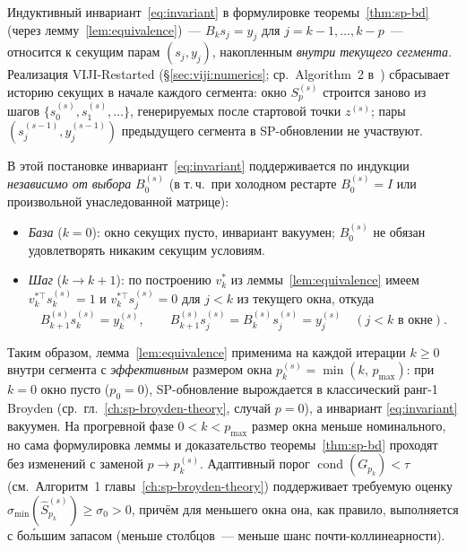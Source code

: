 \begin{remark}
\label{rem:invariant-restart}
Индуктивный инвариант~\eqref{eq:invariant} в формулировке
теоремы~\ref{thm:sp-bd} (через лемму~\ref{lem:equivalence})~---
$B_k s_j = y_j$ для $j = k{-}1,\ldots,k{-}p$~--- относится к секущим
парам $(s_j, y_j)$, накопленным \emph{внутри текущего сегмента}.
Реализация VIJI-Restarted (\S\ref{sec:viji:numerics}; ср.\ Algorithm~2
в~\cite{Agafonov2024VIJI}) сбрасывает историю секущих в начале каждого
сегмента: окно $S_{p}^{(s)}$ строится заново из шагов
$\{s_0^{(s)}, s_1^{(s)}, \ldots\}$, генерируемых после стартовой точки
$z^{(s)}$; пары $(s_j^{(s-1)}, y_j^{(s-1)})$ предыдущего сегмента в
SP-обновлении не участвуют.

В этой постановке инвариант~\eqref{eq:invariant} поддерживается по
индукции \emph{независимо от выбора} $B_0^{(s)}$ (в т.\,ч.\ при холодном
рестарте $B_0^{(s)} = I$ или произвольной унаследованной матрице):
\begin{itemize}
\item \emph{База} ($k=0$): окно секущих пусто, инвариант вакуумен;
      $B_0^{(s)}$ не обязан удовлетворять никаким секущим условиям.
\item \emph{Шаг} ($k \to k+1$): по построению $v_k^{*}$ из
      леммы~\ref{lem:equivalence} имеем $v_k^{*\top} s_k^{(s)} = 1$ и
      $v_k^{*\top} s_j^{(s)} = 0$ для $j < k$ из текущего окна, откуда
      \[
        B_{k+1}^{(s)} s_k^{(s)} = y_k^{(s)},
        \qquad
        B_{k+1}^{(s)} s_j^{(s)} = B_k^{(s)} s_j^{(s)} = y_j^{(s)}
        \quad (j < k\text{ в окне}).
      \]
\end{itemize}
Таким образом, лемма~\ref{lem:equivalence} применима на каждой итерации
$k \ge 0$ внутри сегмента с \emph{эффективным} размером окна
$p_k^{(s)} = \min(k,\,p_{\max})$: при $k=0$ окно пусто ($p_0 = 0$),
SP-обновление вырождается в классический ранг-1 Broyden
(ср.~гл.~\ref{ch:sp-broyden-theory}, случай $p=0$), а инвариант
\eqref{eq:invariant} вакуумен. На прогревной фазе $0 < k < p_{\max}$
размер окна меньше номинального, но сама формулировка леммы и
доказательство теоремы~\ref{thm:sp-bd} проходят без изменений с заменой
$p \to p_k^{(s)}$. Адаптивный порог $\operatorname{cond}(G_{p_k}) < \tau$
(см.\ Алгоритм~1 главы~\ref{ch:sp-broyden-theory}) поддерживает требуемую
оценку $\sigma_{\min}(\widehat{S}_{p_k}^{(s)}) \ge \sigma_0 > 0$, причём
для меньшего окна она, как правило, выполняется с бо\'льшим запасом
(меньше столбцов~--- меньше шанс почти-коллинеарности).


\end{remark}
